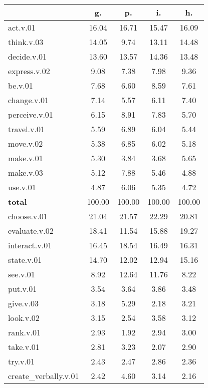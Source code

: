 \begin{table}[h!]
\begin{center}
\begin{tabular}{| l || c | c | c | c |}\hline
 & {\bf g.} & {\bf p.} & {\bf i.} & {\bf h.} \\\hline\hline
act.v.01 & 16.04  & 16.71  & 15.47  & 16.09 \\\hline
think.v.03 & 14.05  & 9.74  & 13.11  & 14.48 \\\hline
decide.v.01 & 13.60  & 13.57  & 14.36  & 13.48 \\\hline
express.v.02 & 9.08  & 7.38  & 7.98  & 9.36 \\\hline
be.v.01 & 7.68  & 6.60  & 8.59  & 7.61 \\\hline
change.v.01 & 7.14  & 5.57  & 6.11  & 7.40 \\\hline
perceive.v.01 & 6.15  & 8.91  & 7.83  & 5.70 \\\hline
travel.v.01 & 5.59  & 6.89  & 6.04  & 5.44 \\\hline
move.v.02 & 5.38  & 6.85  & 6.02  & 5.18 \\\hline
make.v.01 & 5.30  & 3.84  & 3.68  & 5.65 \\\hline
make.v.03 & 5.12  & 7.88  & 5.46  & 4.88 \\\hline
use.v.01 & 4.87  & 6.06  & 5.35  & 4.72 \\\hline\hline
{{\bf total}} & 100.00  & 100.00  & 100.00  & 100.00 \\\hline\hline\hline
choose.v.01 & 21.04  & 21.57  & 22.29  & 20.81 \\\hline
evaluate.v.02 & 18.41  & 11.54  & 15.88  & 19.27 \\\hline
interact.v.01 & 16.45  & 18.54  & 16.49  & 16.31 \\\hline
state.v.01 & 14.70  & 12.02  & 12.94  & 15.16 \\\hline
see.v.01 & 8.92  & 12.64  & 11.76  & 8.22 \\\hline
put.v.01 & 3.54  & 3.64  & 3.86  & 3.48 \\\hline
give.v.03 & 3.18  & 5.29  & 2.18  & 3.21 \\\hline
look.v.02 & 3.15  & 2.54  & 3.58  & 3.12 \\\hline
rank.v.01 & 2.93  & 1.92  & 2.94  & 3.00 \\\hline
take.v.01 & 2.81  & 3.23  & 2.07  & 2.90 \\\hline
try.v.01 & 2.43  & 2.47  & 2.86  & 2.36 \\\hline
create\_verbally.v.01 & 2.42  & 4.60  & 3.14  & 2.16 \\\hline\hline

\end{tabular}
\end{center}
\end{table}
